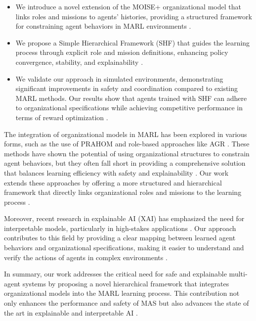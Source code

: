\documentclass[sigconf,anonymous]{aamas}
\begin{document}
\begin{itemize}
    \item We introduce a novel extension of the MOISE+ organizational model that links roles and missions to agents' histories, providing a structured framework for constraining agent behaviors in MARL environments \cite{hubner2010moise}.
    \item We propose a Simple Hierarchical Framework (SHF) that guides the learning process through explicit role and mission definitions, enhancing policy convergence, stability, and explainability \cite{foerster2018counterfactual, yang2018mean}.
    \item We validate our approach in simulated environments, demonstrating significant improvements in safety and coordination compared to existing MARL methods. Our results show that agents trained with SHF can adhere to organizational specifications while achieving competitive performance in terms of reward optimization \cite{chu2020multi, wei2019safe}.
\end{itemize}


The integration of organizational models in MARL has been explored in various forms, such as the use of PRAHOM \cite{soule2024} and role-based approaches like AGR \cite{hernandez2019survey}. These methods have shown the potential of using organizational structures to constrain agent behaviors, but they often fall short in providing a comprehensive solution that balances learning efficiency with safety and explainability \cite{ghosal2021explainable}. Our work extends these approaches by offering a more structured and hierarchical framework that directly links organizational roles and missions to the learning process \cite{hubner2010moise, yang2018mean}.

Moreover, recent research in explainable AI (XAI) has emphasized the need for interpretable models, particularly in high-stakes applications \cite{ghosal2021explainable}. Our approach contributes to this field by providing a clear mapping between learned agent behaviors and organizational specifications, making it easier to understand and verify the actions of agents in complex environments \cite{su2021toward, castaneda2019policy}.

In summary, our work addresses the critical need for safe and explainable multi-agent systems by proposing a novel hierarchical framework that integrates organizational models into the MARL learning process. This contribution not only enhances the performance and safety of MAS but also advances the state of the art in explainable and interpretable AI \cite{bastani2018verifiable, wei2019safe}.
\end{document}
